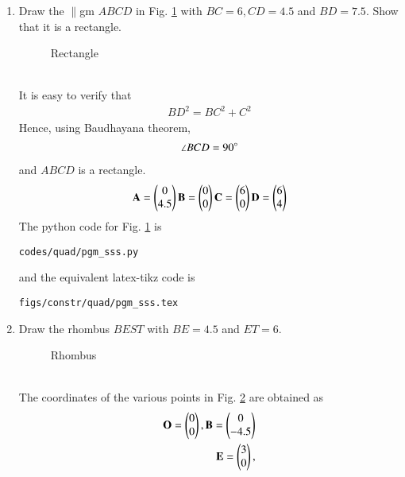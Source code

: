 \begin{enumerate}[label=\thesubsection.\arabic*.,ref=\thesubsection.\theenumi]
\item Draw the $\parallel$gm $ABCD$ in 	Fig. \ref{fig:pgm_sss}	
with $BC = 6, CD = 4.5$ and $BD=7.5$.  Show that it is a rectangle.
\label{const:pgm_sss}
%
\begin{figure}[!ht]
	\begin{center}
		\resizebox{\columnwidth}{!}{}
	\end{center}
	\caption{Rectangle}
	\label{fig:pgm_sss}	
\end{figure}
\\
\solution It is easy to verify that 
%
\begin{align}
BD^2=BC^2+C^2
\end{align}
%
Hence, using Baudhayana theorem, 
%
\begin{align}
\angle BCD = 90\degree
\end{align}
%
and  $ABCD$ is a rectangle.
\begin{align}
\mathbf{A} = \begin{pmatrix}0\\4.5\end{pmatrix}
\mathbf{B} = \begin{pmatrix}0\\0\end{pmatrix}
\mathbf{C} = \begin{pmatrix}6\\0\end{pmatrix}
\mathbf{D} = \begin{pmatrix}6\\4\end{pmatrix}
\end{align}
%
The python code for  Fig. \ref{fig:pgm_sss} is
\begin{lstlisting}
codes/quad/pgm_sss.py
\end{lstlisting}
%
and the equivalent latex-tikz code is
%
\begin{lstlisting}
figs/constr/quad/pgm_sss.tex
\end{lstlisting}
%
%
%
%
%
\item Draw the rhombus $BEST$ with $BE = 4.5$ and $ET = 6$. 
\begin{figure}[!ht]
	\begin{center}
		\resizebox{\columnwidth}{!}{}
	\end{center}
	\caption{Rhombus}
	\label{fig:rhom_sss}	
\end{figure}
\\
\solution The coordinates of the various points in Fig. \ref{fig:rhom_sss} are obtained as
%
\begin{align}
\vec{O} = \myvec{0\\0},
\vec{B} = \myvec{0\\-4.5}
\\
\vec{E} = \myvec{3\\0},

\end{align}
\end{enumerate}
